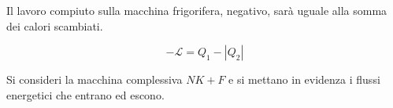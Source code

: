 \begin{figure}[htpb]
\end{figure}
\FloatBarrier
Il lavoro compiuto sulla macchina frigorifera, negativo, sarà uguale alla somma dei calori scambiati.

\[
	-\mathcal{L} = Q_1-|Q_2|
\]

Si consideri la macchina complessiva $NK+F$ e si mettano in evidenza i flussi energetici che entrano ed escono.

